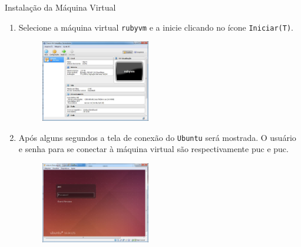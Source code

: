 \begin{frame}{Instalação da Máquina Virtual}
\begin{enumerate}
 \framebreak
    \item Selecione a máquina virtual \verb!rubyvm! e a inicie clicando no ícone \verb!Iniciar(T)!.
    \begin{figure}[h!]
      \centering
      \includegraphics[width=0.45\textwidth]{devops/imagens/virtual-box-acrescentar-vm-3.jpg}
    \end{figure}
    
 \framebreak
    \item Após alguns segundos a tela de conexão do \verb!Ubuntu! será mostrada. O usuário e senha
      para se conectar à máquina virtual são respectivamente \alert{puc} e \alert{puc}.
    \begin{figure}[h!]
      \centering
      \includegraphics[width=0.45\textwidth]{devops/imagens/virtual-box-acrescentar-vm-4.jpg}
    \end{figure}
    
  \end{enumerate}
   
\end{frame}
